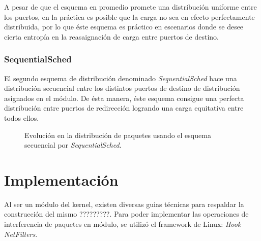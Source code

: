 A pesar de que el esquema en promedio promete una distribución uniforme entre los puertos, en la práctica es posible que la carga no sea en efecto perfectamente distribuida, por lo que éste esquema es práctico en escenarios donde se desee cierta entropía en la reasaignación de carga entre puertos de destino.

\subsubsection{SequentialSched}
El segundo esquema de distribución denominado \emph{SequentialSched} hace una distribución secuencial entre los distintos puertos de destino de distribución asignados en el módulo. De ésta manera, éste esquema consigue una perfecta distribución entre puertos de redirección logrando una carga equitativa entre todos ellos.

\begin{figure}[th!]
\centering
{}
\caption{Evolución en la distribución de paquetes usando el esquema secuencial por \emph{SequentialSched}.}
\label{fig:SequentialSched}
\end{figure}

\section{Implementación}
Al ser un módulo del kernel, existen diversas guias técnicas para respaldar la construcción del mismo ?????????. Para poder implementar las operaciones de interferencia de paquetes en módulo, se utilizó el framework de Linux: \emph{Hook NetFilters}.

